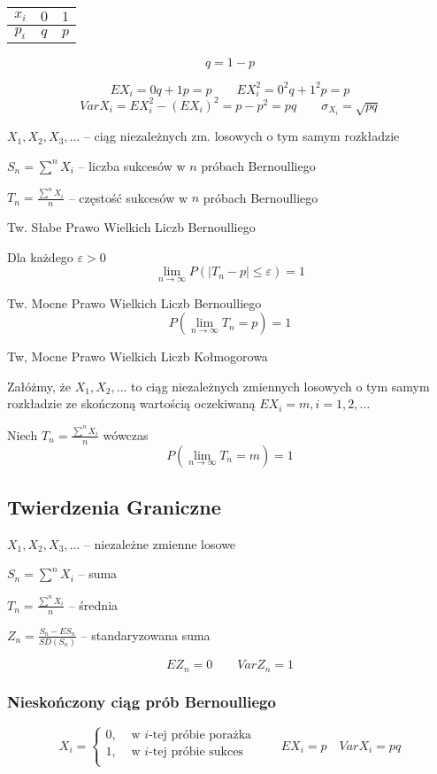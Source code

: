 \documentclass[../Matematyka.tex]{subfiles}
\begin{document}
\begin{table}[H]
    \centering
    \begin{tabular}{c|c|c}
        \(x_i\) & \(0\) & \(1\) \\\hline
        \(p_i\) & \(q\) & \(p\) 
    \end{tabular}
    \[q = 1 - p\]
\end{table}

\[EX_i = 0q + 1p = p \qquad EX^2_i = 0^2q + 1^2p = p\]
\[VarX_i = EX^2_i - (EX_i)^2 = p - p^2 = pq \qquad \sigma_{X_i} = \sqrt{pq}\]

\(X_1, X_2, X_3, \ldots\) -- ciąg niezależnych zm. losowych o tym samym rozkładzie

\(S_n = \sum^n X_i\) -- liczba sukcesów w \(n\) próbach Bernoulliego

\(T_n = \frac{\sum^n X_i}{n}\) -- częstość sukcesów w \(n\) próbach Bernoulliego

Tw. Słabe Prawo Wielkich Liczb Bernoulliego

Dla każdego \(\varepsilon > 0\)
\[\lim_{n \rightarrow \infty} P(|T_n - p| \leq \varepsilon) = 1\]

Tw. Mocne Prawo Wielkich Liczb Bernoulliego
\[P(\lim_{n\rightarrow\infty} T_n = p) = 1\]

Tw, Mocne Prawo Wielkich Liczb Kołmogorowa

Załóżmy, że \(X_1, X_2, \ldots\) to ciąg niezależnych zmiennych losowych o tym samym rozkładzie ze skończoną wartością oczekiwaną \(EX_i = m, i=1,2,\ldots\)

Niech \(T_n = \frac{\sum^n X_i}{n}\) wówczas
\[P(\lim_{n\rightarrow\infty} T_n = m) = 1\]

\newpage
\subsection{Twierdzenia Graniczne}
\(X_1, X_2, X_3, \ldots\) -- niezależne zmienne losowe

\(S_n = \sum^n X_i\) -- suma

\(T_n = \frac{\sum^n X_i}{n}\) -- średnia

\(Z_n = \frac{S_n - ES_n}{SD(S_n)}\) -- standaryzowana suma

\[EZ_n = 0 \qquad VarZ_n = 1\]

\subsubsection*{Nieskończony ciąg prób Bernoulliego}
\[X_i = \begin{cases}
    0,& \text{ w } i\text{-tej próbie porażka}\\
    1,& \text{ w } i\text{-tej próbie sukces}\\
\end{cases} \qquad EX_i = p \quad VarX_i = pq\]
\end{document}
